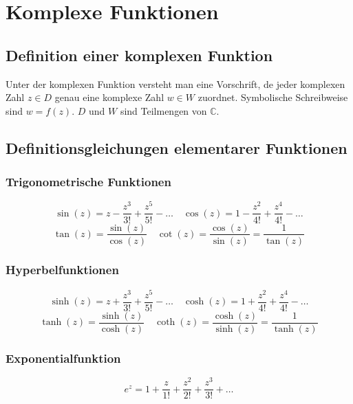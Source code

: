 \section{Komplexe Funktionen}
\subsection{Definition einer komplexen Funktion}
Unter der komplexen Funktion versteht man eine Vorschrift, de jeder komplexen Zahl $z\in D$ genau eine komplexe Zahl $w\in W$ zuordnet. Symbolische Schreibweise sind $w=f\left(z\right)$. $D$ und $W$ sind Teilmengen von $\mathbb{C}$.
\subsection{Definitionsgleichungen elementarer Funktionen}
\subsubsection{Trigonometrische Funktionen}
\begin{equation}
\boxed{\sin\left(z\right)=z-\dfrac{z^3}{3!}+\dfrac{z^5}{5!}-\dotso}
\quad
\boxed{\cos\left(z\right)=1-\dfrac{z^2}{4!}+\dfrac{z^4}{4!}-\dotso}
\end{equation}
\begin{equation}
\boxed{\tan\left(z\right)=\dfrac{\sin\left(z\right)}{\cos\left(z\right)}}
\quad
\boxed{\cot\left(z\right)=\dfrac{\cos\left(z\right)}{\sin\left(z\right)}=\dfrac{1}{\tan\left(z\right)}}
\end{equation}
\subsubsection{Hyperbelfunktionen}
\begin{equation}
\boxed{\sinh\left(z\right)=z+\dfrac{z^3}{3!}+\dfrac{z^5}{5!}-\dotso}
\quad
\boxed{\cosh\left(z\right)=1+\dfrac{z^2}{4!}+\dfrac{z^4}{4!}-\dotso}
\end{equation}
\begin{equation}
\boxed{\tanh\left(z\right)=\dfrac{\sinh\left(z\right)}{\cosh\left(z\right)}}
\quad
\boxed{\coth\left(z\right)=\dfrac{\cosh\left(z\right)}{\sinh\left(z\right)}=\dfrac{1}{\tanh\left(z\right)}}
\end{equation}
\subsubsection{Exponentialfunktion}
\begin{equation}
\boxed{e^z=1+\dfrac{z}{1!}+\dfrac{z^2}{2!}+\dfrac{z^3}{3!}+\dotso}
\end{equation}
